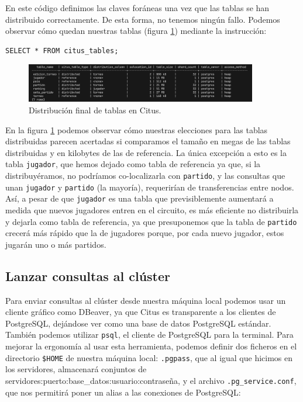 En este código definimos las claves foráneas una vez que las tablas se han distribuido correctamente. De esta forma, no tenemos ningún fallo. Podemos observar cómo quedan nuestras tablas (figura \ref{fig:dist_citus}) mediante la instrucción:

\begin{verbatim}
SELECT * FROM citus_tables;
\end{verbatim}

\begin{figure}[H]
\centering
\includegraphics[width=0.9\textwidth]{fotos/citus/table_sizes_and_distributed.png}
\caption{Distribución final de tablas en Citus.}
\label{fig:dist_citus}
\end{figure}

En la figura \ref{fig:dist_citus} podemos observar cómo nuestras elecciones para las tablas distribuidas parecen acertadas si comparamos el tamaño en megas de las tablas distribuidas y en kilobytes de las de referencia. La única excepción a esto es la tabla \texttt{jugador}, que hemos dejado como tabla de referencia ya que, si la distribuyéramos, no podríamos co-localizarla con \texttt{partido}, y las consultas que unan \texttt{jugador} y \texttt{partido} (la mayoría), requerirían de transferencias entre nodos. Así, a pesar de que \texttt{jugador} es una tabla que previsiblemente aumentará a medida que nuevos jugadores entren en el circuito, es más eficiente no distribuirla y dejarla como tabla de referencia, ya que presuponemos que la tabla de \texttt{partido} crecerá más rápido que la de jugadores porque, por cada nuevo jugador, estos jugarán uno o más partidos.

\subsection*{Lanzar consultas al clúster}

Para enviar consultas al clúster desde nuestra máquina local podemos usar un cliente gráfico como DBeaver, ya que Citus es transparente a los clientes de PostgreSQL, dejándose ver como una base de datos PostgreSQL estándar. \\

También podemos utilizar \texttt{psql}, el cliente de PostgreSQL para la terminal. Para mejorar la ergonomía al usar esta herramienta, podemos definir dos ficheros en el directorio \texttt{\$HOME} de nuestra máquina local: \texttt{.pgpass}, que al igual que hicimos en los servidores, almacenará conjuntos de servidores:puerto:base\_datos:usuario:contraseña, y el archivo \texttt{.pg\_service.conf}, que nos permitirá poner un alias a las conexiones de PostgreSQL:


